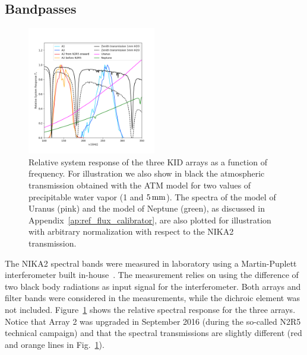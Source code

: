 \subsection{Bandpasses}
\label{se:instru_bandpass}

\begin{figure}[ht!] %
\begin{center}
\includegraphics[clip,trim={0, 1cm, 0, 2cm},width=0.5\textwidth]{Figures/bandpasses_nika2_colorsok.png}
\caption[NIKA2 transmission]{Relative system response of the three KID
  arrays as a
  function of frequency. For illustration we also show in black
  the atmospheric transmission obtained with the ATM model \citep{ATM,
    Pardo2001} for two values of precipitable water vapor (1 and
  $5\,\rm{mm}$).
  The spectra of the model of Uranus (pink) and the model of
  Neptune
  (green), as discussed in Appendix~\ref{ap:ref_flux_calibrator}, are
  also plotted for illustration with arbitrary
  normalization with respect to the NIKA2 transmission.} 
 \label{spectralband1}
\end{center}
\end{figure}

The NIKA2 spectral bands were measured in laboratory using a
Martin-Puplett interferometer built in-house~\citep{Durand2007_these}.
The measurement relies on using the difference of two black
body radiations as input signal for the interferometer. 
{\lp Both arrays and filter bands were considered in the
measurements, while the dichroic element was not included.}
Figure~\ref{spectralband1} shows the relative spectral response for
the three arrays. Notice that Array 2 was
upgraded in September 2016 (during the so-called N2R5 technical campaign) and that
the spectral transmissions are slightly different (red and orange lines in
Fig.~\ref{spectralband1}).

